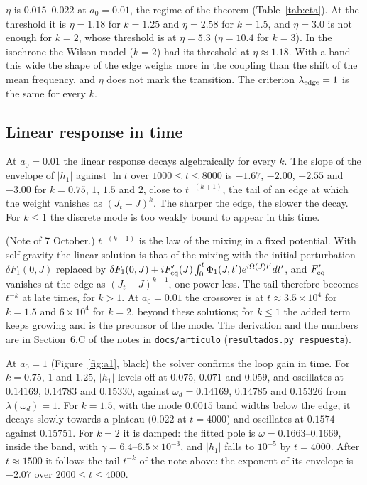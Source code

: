 \documentclass[11pt,a4paper]{article}
\begin{document}
$\eta$ is $0.015$--$0.022$ at $a_0=0.01$, the regime of the theorem (Table~\ref{tab:eta}).
At the threshold it is $\eta=1.18$ for $k=1.25$ and $\eta=2.58$ for $k=1.5$, and
$\eta=3.0$ is not enough for $k=2$, whose threshold is at $\eta=5.3$ ($\eta=10.4$ for $k=3$). In the isochrone the Wilson model ($k=2$) had its threshold
at $\eta\approx1.18$. With a band this wide the shape of the edge weighs more in the
coupling than the shift of the mean frequency, and $\eta$ does not mark the transition. The
criterion $\lambda_{\rm edge}=1$ is the same for every $k$.

\subsection{Linear response in time}
\label{sec:lineal_t}

At $a_0=0.01$ the linear response decays algebraically for every $k$. The slope of the
envelope of $|h_1|$ against $\ln t$ over $1000\le t\le8000$ is $-1.67$, $-2.00$, $-2.55$ and
$-3.00$ for $k=0.75$, $1$, $1.5$ and $2$, close to $t^{-(k+1)}$, the tail of an edge at which
the weight vanishes as $(J_t-J)^k$. The sharper the edge, the slower the decay. For $k\le1$
the discrete mode is too weakly bound to appear in this time.

(Note of 7 October.) $t^{-(k+1)}$ is the law of the mixing in a fixed potential. With
self-gravity the linear solution is that of the mixing with the initial perturbation
$\delta F_1(0,J)$ replaced by $\delta F_1(0,J)+iF_{\rm eq}'(J)\int_0^t\Phi_1(J,t')e^{i\Omega(J)t'}dt'$,
and $F_{\rm eq}'$ vanishes at the edge as $(J_t-J)^{k-1}$, one power less. The tail therefore
becomes $t^{-k}$ at late times, for $k>1$. At $a_0=0.01$ the crossover is at $t\approx3.5\times10^4$
for $k=1.5$ and $6\times10^4$ for $k=2$, beyond these solutions; for $k\le1$ the added term keeps
growing and is the precursor of the mode. The derivation and the numbers are in Section~6.C of
the notes in \texttt{docs/articulo} (\texttt{resultados.py respuesta}).

At $a_0=1$ (Figure~\ref{fig:a1}, black) the solver confirms the loop gain in time. For
$k=0.75$, $1$ and $1.25$, $|h_1|$ levels off at $0.075$, $0.071$ and $0.059$, and oscillates at
$0.14169$, $0.14783$ and $0.15330$, against $\omega_d=0.14169$, $0.14785$ and $0.15326$ from
$\lambda(\omega_d)=1$. For $k=1.5$, with the mode $0.0015$ band widths below the edge, it decays
slowly towards a plateau ($0.022$ at $t=4000$) and oscillates at $0.1574$ against $0.15751$.
For $k=2$ it is damped: the fitted pole is $\omega=0.1663$--$0.1669$, inside the band, with
$\gamma=6.4$--$6.5\times10^{-3}$, and $|h_1|$ falls to $10^{-5}$ by $t=4000$. After $t\approx1500$ it
follows the tail $t^{-k}$ of the note above: the exponent of its envelope is $-2.07$ over
$2000\le t\le4000$.
\end{document}
